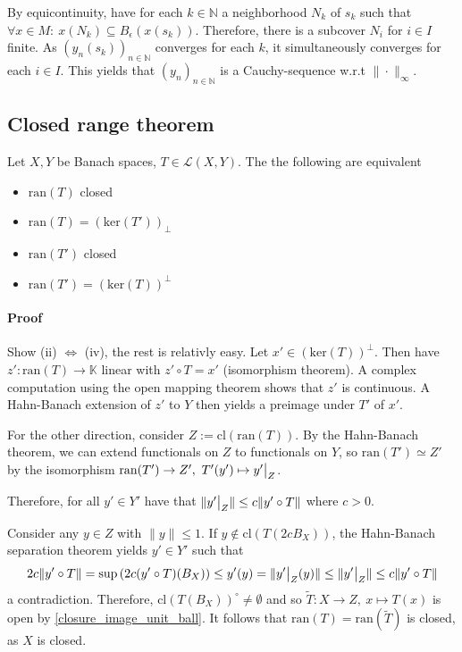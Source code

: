 \documentclass{scrartcl}
\newcommand{\N}{\mathbb{N}}
\newcommand\restr[2]{{
    \left.\kern-\nulldelimiterspace
    #1
    \vphantom{\big|}
    \right|_{#2}
}}
\begin{document}
By equicontinuity, have for each $k \in \N$ a neighborhood $N_k$ of $s_k$ such that $\forall x \in M: \ x(N_k) \subseteq B_\epsilon(x(s_k))$.
Therefore, there is a subcover $N_i$ for $i \in I$ finite. As $(y_n(s_k))_{n \in \N}$ converges for each $k$, it simultaneously converges for each $i \in I$. This yields that $(y_n)_{n \in \N}$ is a Cauchy-sequence w.r.t $\|\cdot\|_{\infty}$.

\subsection{Closed range theorem}
Let $X, Y$ be Banach spaces, $T \in \mathcal{L}(X, Y)$. The the following are equivalent
\begin{itemize}
    \item $\mathrm{ran}(T)$ closed
    \item $\mathrm{ran}(T) = (\mathrm{ker}(T'))_\perp$
    \item $\mathrm{ran}(T')$ closed
    \item $\mathrm{ran}(T') = (\mathrm{ker}(T))^\perp$
\end{itemize} 
\paragraph{Proof} Show (ii) $\Leftrightarrow$ (iv), the rest is relativly easy. Let $x' \in (\mathrm{ker}(T))^\perp$. Then have $z': \mathrm{ran}(T) \to \mathbb{K}$ linear with $z' \circ T = x'$ (isomorphism theorem).
A complex computation using the open mapping theorem shows that $z'$ is continuous.
A Hahn-Banach extension of $z'$ to $Y$ then yields a preimage under $T'$ of $x'$.

For the other direction, consider $Z := \mathrm{cl}(\mathrm{ran}(T))$. By the Hahn-Banach theorem, we can extend functionals on $Z$ to functionals on $Y$, so $\mathrm{ran}(T') \simeq Z'$ by the isomorphism $\mathrm{ran}(T') \to Z', \ T'(y') \mapsto \restr{y'}{Z}$.

Therefore, for all $y' \in Y'$ have that $\| \restr{y'}{Z} \| \leq c \| y' \circ T \|$ where $c > 0$. 

Consider any $y \in Z$ with $\|y\| \leq 1$. If $y \notin \mathrm{cl}(T(2c B_X))$, the Hahn-Banach separation theorem yields $y' \in Y'$ such that
\begin{equation*}
    2c \| y' \circ T \| = \sup \left( 2c (y' \circ T)(B_X) \right) \leq y'(y) = \| \restr{y'}{Z}(y) \| \leq \| \restr{y'}{Z} \| \leq c \| y' \circ T \| 
\end{equation*}
a contradiction. Therefore, $\mathrm{cl}(T(B_X))^\circ \neq \emptyset$ and so $\tilde{T}: X \to Z, \ x \mapsto T(x)$ is open by \ref{closure_image_unit_ball}.
It follows that $\mathrm{ran}(T) = \mathrm{ran}(\tilde{T})$ is closed, as $X$ is closed.
\end{document}
